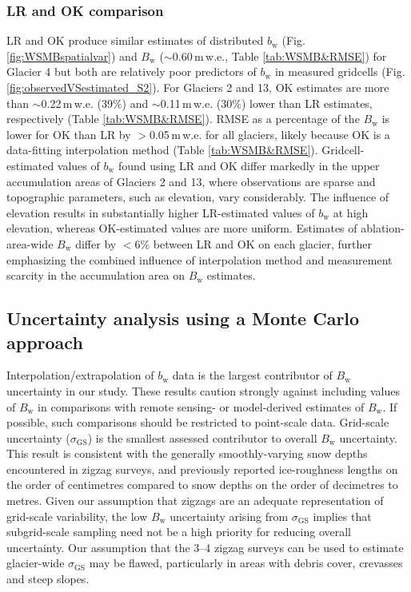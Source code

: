 \documentclass[twocolumn, letterpaper]{igs}
\begin{document}
\subsubsection{LR and OK comparison}
 
LR and OK produce similar estimates of distributed $b_\mathrm{w}$ (Fig. \ref{fig:WSMBspatialvar}) and $B_\mathrm{w}$ ($\sim$0.60\,m\,w.e., Table \ref{tab:WSMB&RMSE}) for Glacier 4 but both are relatively poor predictors of $b_\mathrm{w}$ in measured gridcells (Fig. \ref{fig:observedVSestimated_S2}). For Glaciers 2 and 13, OK estimates are more than $\sim$0.22\,m\,w.e. (39\%) and $\sim$0.11\,m\,w.e. (30\%) lower than LR estimates, respectively (Table \ref{tab:WSMB&RMSE}). RMSE as a percentage of the $B_\mathrm{w}$ is lower for OK than LR by $>$0.05\,m\,w.e. for all glaciers, likely because OK is a data-fitting interpolation method (Table \ref{tab:WSMB&RMSE}). Gridcell-estimated values of $b_\mathrm{w}$ found using LR and OK differ markedly in the upper accumulation areas of Glaciers 2 and 13, where observations are sparse and topographic parameters, such as elevation, vary considerably. The influence of elevation results in substantially higher LR-estimated values of $b_\mathrm{w}$ at high elevation, whereas OK-estimated values are more uniform. 
Estimates of ablation-area-wide $B_\mathrm{w}$ differ by $<$6\% between LR and OK on each glacier, further emphasizing the combined influence of interpolation method and measurement scarcity in the accumulation area on $B_\mathrm{w}$ estimates.

\subsection{Uncertainty analysis using a Monte Carlo approach}

Interpolation/extrapolation of $b_\mathrm{w}$ data is the largest contributor of $B_\mathrm{w}$ uncertainty in our study. These results caution strongly against including values of $B_\mathrm{w}$ in comparisons with remote sensing- or model-derived estimates of $B_\mathrm{w}$. If possible, such comparisons should be restricted to point-scale data. Grid-scale uncertainty ($\sigma_{\mathrm{GS}}$) is the smallest assessed contributor to overall $B_\mathrm{w}$ uncertainty. This result is consistent with the generally smoothly-varying snow depths encountered in zigzag surveys, and previously reported ice-roughness lengths on the order of centimetres \citep[e.g.][]{Hock2005} compared to snow depths on the order of decimetres to metres. Given our assumption that zigzags are an adequate representation of grid-scale variability, the low $B_\mathrm{w}$ uncertainty arising from $\sigma_{\mathrm{GS}}$ implies that subgrid-scale sampling need not be a high priority for reducing overall uncertainty. Our assumption that the 3--4 zigzag surveys can be used to estimate glacier-wide $\sigma_{\mathrm{GS}}$ may be flawed, particularly in areas with debris cover, crevasses and steep slopes.
\end{document}
